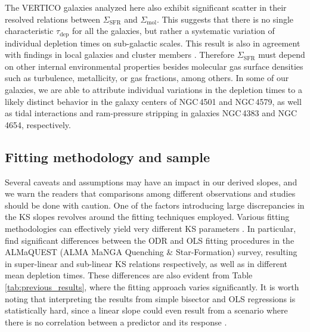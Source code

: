 \documentclass[longauth]{aa}
\begin{document}
The VERTICO galaxies analyzed here also exhibit significant scatter in their resolved relations between $\Sigma_\mathrm{SFR}$ and $\Sigma_\mathrm{mol}$. This suggests that there is no single characteristic $\tau_{\mathrm{dep}}$ for all the galaxies, but rather a systematic variation of individual depletion times on sub-galactic scales. This result is also in agreement with findings in local galaxies \citep{Bigiel2008,Leroy2013,Shetty2014,Utomo2017,Ellison2021} and cluster members \citep{Zabel2020}. Therefore $\Sigma_\mathrm{SFR}$ must depend on other internal environmental properties besides molecular gas surface densities such as turbulence, metallicity, or gas fractions, among others. In some of our galaxies, we are able to attribute individual variations in the depletion times to a likely distinct behavior in the galaxy centers of NGC\,4501 and NGC\,4579, as well as tidal interactions and ram-pressure stripping in galaxies NGC\,4383 and NGC\,4654, respectively. 

\subsection{Fitting methodology and sample}
Several caveats and assumptions may have an impact in our derived slopes, and we warn the readers that comparisons among different observations and studies should be done with caution. One of the factors introducing large discrepancies in the KS slopes revolves around the fitting techniques employed. Various fitting methodologies can effectively yield very different KS parameters \citep{Leroy2013,Reyes2019}. In particular, \citet{Ellison2021} find significant differences between the ODR and OLS fitting procedures in the ALMaQUEST (ALMA MaNGA Quenching \& Star-Formation) survey, resulting in super-linear and sub-linear KS relations respectively, as well as in different mean depletion times. These differences are also evident from Table \ref{tab:previous_results}, where the fitting approach varies significantly. It is worth noting that interpreting the results from simple bisector and OLS regressions is statistically hard, since a linear slope could even result from a scenario where there is no correlation between a predictor and its response \citep[see e.g.,][]{Isobe1990,Shetty2014}.
\end{document}
